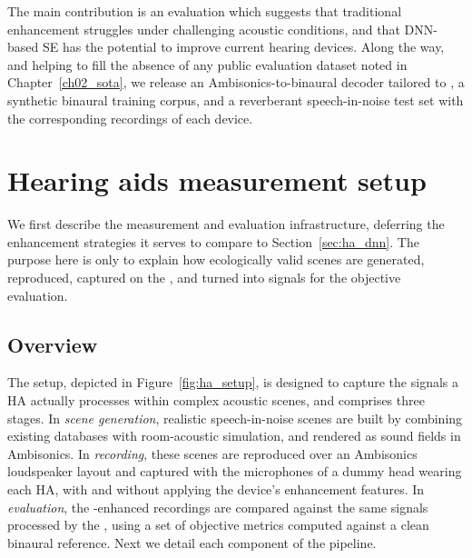 The main contribution
is an evaluation which suggests that  traditional enhancement
struggles under challenging acoustic conditions, and that \acrshort{DNN}-based
\acrshort{SE} has the potential to improve current hearing devices.
Along the way, and helping to fill the absence of any public  evaluation dataset noted in Chapter~\ref{ch02_sota}, we release an
Ambisonics-to-binaural decoder tailored to , a synthetic
binaural training corpus, and a reverberant speech-in-noise test set with the
corresponding recordings of each device.

\section{Hearing aids measurement setup}
\label{sec:ha_setup}

We first describe the measurement and evaluation infrastructure, deferring the
enhancement strategies it serves to compare to
Section~\ref{sec:ha_dnn}. The purpose here is only to explain how ecologically
valid scenes are generated, reproduced, captured on the , and
turned into signals for the objective evaluation.

\subsection{Overview}
\label{sec:ha_overview}

The setup, depicted in Figure~\ref{fig:ha_setup}, is designed to capture the
signals a \acrshort{HA} actually processes within complex acoustic scenes,
and comprises three stages. In \emph{scene generation}, realistic
speech-in-noise scenes are built by combining existing databases with
room-acoustic simulation, and rendered as sound fields in Ambisonics. In
\emph{recording}, these scenes are reproduced over an Ambisonics loudspeaker
layout and captured with the microphones of a dummy head wearing each \acrshort{HA}, with and without applying the device's enhancement features. In \emph{evaluation},
the -enhanced recordings are compared against the same signals
processed by the , using a set of objective metrics computed
against a clean binaural reference. Next we detail each
component of the pipeline.

